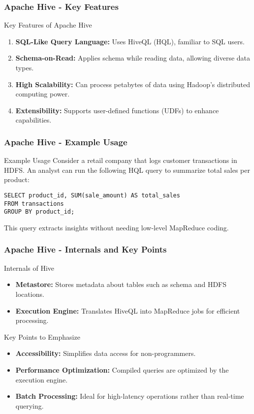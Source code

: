 \documentclass[aspectratio=169]{beamer}
\begin{document}
\begin{frame}[fragile]
    \frametitle{Apache Hive - Key Features}
    \begin{block}{Key Features of Apache Hive}
        \begin{enumerate}
            \item \textbf{SQL-Like Query Language:} Uses HiveQL (HQL), familiar to SQL users.
            \item \textbf{Schema-on-Read:} Applies schema while reading data, allowing diverse data types.
            \item \textbf{High Scalability:} Can process petabytes of data using Hadoop's distributed computing power.
            \item \textbf{Extensibility:} Supports user-defined functions (UDFs) to enhance capabilities.
        \end{enumerate}
    \end{block}
\end{frame}

\begin{frame}[fragile]
    \frametitle{Apache Hive - Example Usage}
    \begin{block}{Example Usage}
        Consider a retail company that logs customer transactions in HDFS. An analyst can run the following HQL query to summarize total sales per product:
        \begin{lstlisting}
SELECT product_id, SUM(sale_amount) AS total_sales
FROM transactions
GROUP BY product_id;
        \end{lstlisting}
        This query extracts insights without needing low-level MapReduce coding.
    \end{block}
\end{frame}

\begin{frame}[fragile]
    \frametitle{Apache Hive - Internals and Key Points}
    \begin{block}{Internals of Hive}
        \begin{itemize}
            \item \textbf{Metastore:} Stores metadata about tables such as schema and HDFS locations.
            \item \textbf{Execution Engine:} Translates HiveQL into MapReduce jobs for efficient processing.
        \end{itemize}
    \end{block}
    
    \begin{block}{Key Points to Emphasize}
        \begin{itemize}
            \item \textbf{Accessibility:} Simplifies data access for non-programmers.
            \item \textbf{Performance Optimization:} Compiled queries are optimized by the execution engine.
            \item \textbf{Batch Processing:} Ideal for high-latency operations rather than real-time querying.
        \end{itemize}
    \end{block}
\end{frame}
\end{document}
